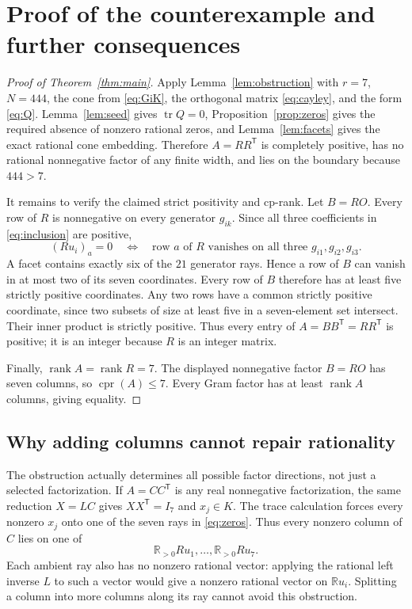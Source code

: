 \documentclass[11pt]{article}
\theoremstyle{definition}
\newcommand{\R}{\mathbb R}
\newcommand{\rank}{\operatorname{rank}}
\newcommand{\tr}{\operatorname{tr}}
\newcommand{\cpr}{\operatorname{cpr}}
\newcommand{\trans}{^{\mathsf T}}
\numberwithin{equation}{section}
\begin{document}
\section{Proof of the counterexample and further consequences}
\begin{proof}[Proof of Theorem~\ref{thm:main}]
Apply Lemma~\ref{lem:obstruction} with $r=7$, $N=444$, the cone from
\eqref{eq:GiK}, the orthogonal matrix \eqref{eq:cayley}, and the form
\eqref{eq:Q}. Lemma~\ref{lem:seed} gives $\tr Q=0$,
Proposition~\ref{prop:zeros} gives the required absence of nonzero rational
zeros, and Lemma~\ref{lem:facets} gives the exact rational cone embedding.
Therefore $A=RR\trans$ is completely positive, has no rational nonnegative
factor of any finite width, and lies on the boundary because $444>7$.

It remains to verify the claimed strict positivity and cp-rank. Let
$B=RO$. Every row of $R$ is nonnegative on every generator $g_{ik}$.
Since all three coefficients in \eqref{eq:inclusion} are positive,
\begin{equation}\label{eq:Bzeros}
 (Ru_i)_a=0
 \quad\Longleftrightarrow\quad
 \text{row $a$ of $R$ vanishes on all three }g_{i1},g_{i2},g_{i3}.
\end{equation}
A facet contains exactly six of the $21$ generator rays. Hence a row of
$B$ can vanish in at most two of its seven coordinates. Every row of $B$
therefore has at least five strictly positive coordinates. Any two rows
have a common strictly positive coordinate, since two subsets of size at
least five in a seven-element set intersect. Their inner product is
strictly positive. Thus every entry of $A=BB\trans=RR\trans$ is positive;
it is an integer because $R$ is an integer matrix.

Finally, $\rank A=\rank R=7$. The displayed nonnegative factor $B=RO$ has
seven columns, so $\cpr(A)\leq7$. Every Gram factor has at least
$\rank A$ columns, giving equality.
\end{proof}

\subsection{Why adding columns cannot repair rationality}
The obstruction actually determines all possible factor directions, not
just a selected factorization. If $A=CC\trans$ is any real nonnegative
factorization, the same reduction $X=LC$ gives $XX\trans=I_7$ and
$x_j\in K$. The trace calculation forces every nonzero $x_j$ onto one of
the seven rays in \eqref{eq:zeros}. Thus every nonzero column of $C$ lies
on one of
\begin{equation}\label{eq:ambientrays}
 \R_{>0}Ru_1,\ldots,\R_{>0}Ru_7.
\end{equation}
Each ambient ray also has no nonzero rational vector: applying the
rational left inverse $L$ to such a vector would give a nonzero rational
vector on $\R u_i$. Splitting a column into more columns along its ray
cannot avoid this obstruction.
\end{document}
